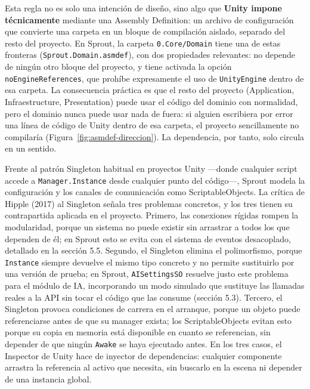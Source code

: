\documentclass[12pt,twoside,titlepage]{report}
\begin{document}
Esta regla no es solo una intención de diseño, sino algo que \textbf{Unity impone técnicamente} mediante una Assembly Definition: un archivo de configuración que convierte una carpeta en un bloque de compilación aislado, separado del resto del proyecto. En Sprout, la carpeta \texttt{0.Core/Domain} tiene una de estas fronteras (\texttt{Sprout.Domain.asmdef}), con dos propiedades relevantes: no depende de ningún otro bloque del proyecto, y tiene activada la opción \texttt{noEngineReferences}, que prohíbe expresamente el uso de \texttt{UnityEngine} dentro de esa carpeta. La consecuencia práctica es que el resto del proyecto (Application, Infraestructure, Presentation) puede usar el código del dominio con normalidad, pero el dominio nunca puede usar nada de fuera: si alguien escribiera por error una línea de código de Unity dentro de esa carpeta, el proyecto sencillamente no compilaría (Figura~\ref{fig:asmdef-direccion}). La dependencia, por tanto, solo circula en un sentido.

Frente al patrón Singleton habitual en proyectos Unity ---donde cualquier script accede a \texttt{Manager.Instance} desde cualquier punto del código---, Sprout modela la configuración y los canales de comunicación como ScriptableObjects. La crítica de Hipple (2017) al Singleton señala tres problemas concretos, y los tres tienen su contrapartida aplicada en el proyecto. Primero, las conexiones rígidas rompen la modularidad, porque un sistema no puede existir sin arrastrar a todos los que dependen de él; en Sprout esto se evita con el sistema de eventos desacoplado, detallado en la sección 5.5. Segundo, el Singleton elimina el polimorfismo, porque \texttt{Instance} siempre devuelve el mismo tipo concreto y no permite sustituirlo por una versión de prueba; en Sprout, \texttt{AISettingsSO} resuelve justo este problema para el módulo de IA, incorporando un modo simulado que sustituye las llamadas reales a la API sin tocar el código que las consume (sección 5.3). Tercero, el Singleton provoca condiciones de carrera en el arranque, porque un objeto puede referenciarse antes de que su manager exista; los ScriptableObjects evitan esto porque su copia en memoria está disponible en cuanto se referencian, sin depender de que ningún \texttt{Awake} se haya ejecutado antes. En los tres casos, el Inspector de Unity hace de inyector de dependencias: cualquier componente arrastra la referencia al activo que necesita, sin buscarlo en la escena ni depender de una instancia global.
\end{document}
